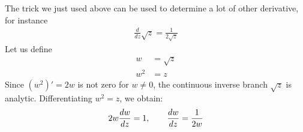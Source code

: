 \begin{framedremark}
The trick we just used above can be used to determine a lot of other derivative, for instance 
\begin{align*} 
	\frac{d}{dz} \sqrt{z} = \frac{1}{2\sqrt{z}}
\end{align*}
Let us define
\begin{align*} 
	w &= \sqrt{z}\\
	w^2 &= z
\end{align*}
Since $\left(w^2\right)' = 2w$ is not zero for $w \neq 0$, the continuous inverse branch $\sqrt{z}$ is analytic. Differentiating $w^2 =  z$, we obtain:
\begin{align*} 
	2w \frac{dw}{dz}  = 1, \quad \quad \frac{dw}{dz} = \frac{1}{2w}
\end{align*}


\end{framedremark}







